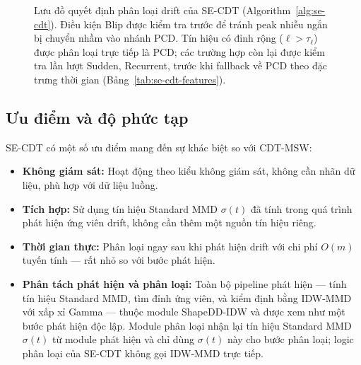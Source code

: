 \begin{figure}[H]
{}
	\caption[Lưu đồ phân loại drift của SE-CDT]{Lưu đồ quyết định phân loại drift của SE-CDT (Algorithm~\ref{alg:se-cdt}). Điều kiện Blip được kiểm tra trước để tránh peak nhiễu ngắn bị chuyển nhầm vào nhánh PCD. Tín hiệu có đỉnh rộng ($\ell > \tau_\ell$) được phân loại trực tiếp là PCD; các trường hợp còn lại được kiểm tra lần lượt Sudden, Recurrent, trước khi fallback về PCD theo đặc trưng thời gian (Bảng~\ref{tab:se-cdt-features}).}
	\label{fig:se-cdt-flowchart}
\end{figure}

\subsection{Ưu điểm và độ phức tạp}

SE-CDT có một số ưu điểm mang đến sự khác biệt so với CDT-MSW:
\begin{itemize}
	\item \textbf{Không giám sát:} Hoạt động theo kiểu không giám sát, không cần nhãn dữ liệu, phù hợp với dữ liệu luồng.
	\item \textbf{Tích hợp:} Sử dụng tín hiệu Standard MMD $\sigma(t)$ đã tính trong quá trình phát hiện ứng viên drift, không cần thêm một nguồn tín hiệu riêng.
	\item \textbf{Thời gian thực:} Phân loại ngay sau khi phát hiện drift với chi phí $O(m)$ tuyến tính --- rất nhỏ so với bước phát hiện.
	\item \textbf{Phân tách phát hiện và phân loại:} Toàn bộ pipeline phát hiện --- tính tín hiệu Standard MMD, tìm đỉnh ứng viên, và kiểm định bằng IDW-MMD với xấp xỉ Gamma --- thuộc module ShapeDD-IDW và được xem như một bước phát hiện độc lập. Module phân loại nhận lại tín hiệu Standard MMD $\sigma(t)$ từ module phát hiện và chỉ dùng $\sigma(t)$ này cho bước phân loại; logic phân loại của SE-CDT không gọi IDW-MMD trực tiếp.
\end{itemize}

